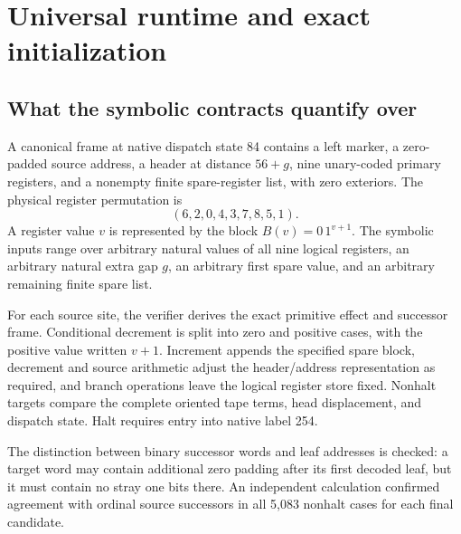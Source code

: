 \section{Universal runtime and exact initialization}\label{sec:verification}

\subsection{What the symbolic contracts quantify over}
A canonical frame at native dispatch state 84 contains a left marker, a
zero-padded source address, a header at distance \(56+g\), nine unary-coded
primary registers, and a nonempty finite spare-register list, with zero
exteriors. The physical register permutation is
\[
                         (6,2,0,4,3,7,8,5,1).
\]
A register value \(v\) is represented by the block
\(B(v)=0\,1^{v+1}\). The symbolic inputs range over arbitrary natural values
of all nine logical registers, an arbitrary natural extra gap \(g\), an
arbitrary first spare value, and an arbitrary remaining finite spare list.

For each source site, the verifier derives the exact primitive effect and
successor frame. Conditional decrement is split into zero and positive
cases, with the positive value written \(v+1\).
Increment appends the specified spare block, decrement and source arithmetic
adjust the header/address representation as required, and branch operations
leave the logical register store fixed. Nonhalt targets compare the complete
oriented tape terms, head displacement, and dispatch state. Halt requires
entry into native label 254.

The distinction between binary successor words and leaf addresses is checked:
a target word may contain additional zero padding after its first decoded
leaf, but it must contain no stray one bits there. An independent calculation
confirmed agreement with ordinal source successors in all 5,083 nonhalt
cases for each final candidate.

